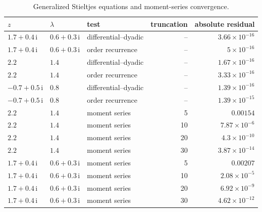 \begin{table}[htbp]
\centering\small
\caption{Generalized Stieltjes equations and moment-series convergence.}
\label{tab:stieltjes-checks}
\begin{tabular}{@{}lllrr@{}}
\toprule
$z$ & $\lambda$ & test & truncation & absolute residual\\
\midrule
$1.7+0.4\,\mathrm{i}$ & $0.6+0.3\,\mathrm{i}$ & differential--dyadic & -- & $3.66\mathbin{\times}10^{-16}$\\
$1.7+0.4\,\mathrm{i}$ & $0.6+0.3\,\mathrm{i}$ & order recurrence & -- & $5\mathbin{\times}10^{-16}$\\
$2.2$ & $1.4$ & differential--dyadic & -- & $1.67\mathbin{\times}10^{-16}$\\
$2.2$ & $1.4$ & order recurrence & -- & $3.33\mathbin{\times}10^{-16}$\\
$-0.7+0.5\,\mathrm{i}$ & $0.8$ & differential--dyadic & -- & $1.39\mathbin{\times}10^{-16}$\\
$-0.7+0.5\,\mathrm{i}$ & $0.8$ & order recurrence & -- & $1.39\mathbin{\times}10^{-15}$\\
$2.2$ & $1.4$ & moment series & 5 & $0.00154$\\
$2.2$ & $1.4$ & moment series & 10 & $7.87\mathbin{\times}10^{-6}$\\
$2.2$ & $1.4$ & moment series & 20 & $4.3\mathbin{\times}10^{-10}$\\
$2.2$ & $1.4$ & moment series & 30 & $3.87\mathbin{\times}10^{-14}$\\
$1.7+0.4\,\mathrm{i}$ & $0.6+0.3\,\mathrm{i}$ & moment series & 5 & $0.00207$\\
$1.7+0.4\,\mathrm{i}$ & $0.6+0.3\,\mathrm{i}$ & moment series & 10 & $2.08\mathbin{\times}10^{-5}$\\
$1.7+0.4\,\mathrm{i}$ & $0.6+0.3\,\mathrm{i}$ & moment series & 20 & $6.92\mathbin{\times}10^{-9}$\\
$1.7+0.4\,\mathrm{i}$ & $0.6+0.3\,\mathrm{i}$ & moment series & 30 & $4.62\mathbin{\times}10^{-12}$\\
\bottomrule
\end{tabular}
\end{table}

